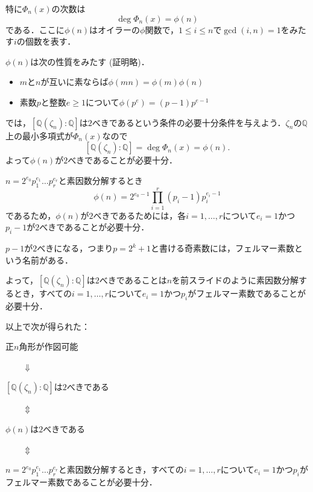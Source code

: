 \documentclass[dvipdfmx,17pt]{beamer}
\theoremstyle{plain}
\newcommand{\Q}{\mathbb{Q}}
\begin{document}
\begin{frame}
特に$\Phi_n(x)$の次数は
\[ \deg \Phi_n(x) = \phi(n) \]
である．ここに$\phi(n)$はオイラーの$\phi$関数で，$1 \le i \le n$で$\gcd(i, n) = 1$をみたす$i$の個数を表す．
\end{frame}

\begin{frame}
$\phi(n)$は次の性質をみたす (証明略)．
\begin{itemize}
\item $m$と$n$が互いに素ならば$\phi(mn) = \phi(m)\phi(n)$
\item 素数$p$と整数$e \ge 1$について$\phi(p^e) = (p-1)p^{e-1}$
\end{itemize}
\end{frame}

\begin{frame}
では，$[\Q(\zeta_n) : \Q]$は$2$べきであるという条件の必要十分条件を与えよう．$\zeta_n$の$\Q$上の最小多項式が$\Phi_n(x)$なので
\[[\Q(\zeta_n) : \Q] = \deg \Phi_n(x) = \phi(n).\]
よって$\phi(n)$が$2$べきであることが必要十分．
\end{frame}

\begin{frame}
$n = 2^{e_0} p_1^{e_1} \dots p_r^{e_r}$と素因数分解するとき
\[\phi(n) = 2^{e_0 - 1} \prod_{i=1}^r (p_i - 1)p_i ^ {e_i - 1} \]
であるため，$\phi(n)$が$2$べきであるためには，各$i = 1, \dots, r$について$e_i = 1$かつ$p_i - 1$が$2$べきであることが必要十分．
\end{frame}

\begin{frame}
$p - 1$が$2$べきになる，つまり$p = 2^k + 1$と書ける奇素数には，フェルマー素数という名前がある．

よって，$[\Q(\zeta_n) : \Q]$は$2$べきであることは$n$を前スライドのように素因数分解するとき，すべての$i = 1, \dots, r$について$e_i = 1$かつ$p_i$がフェルマー素数であることが必要十分．
\end{frame}

\begin{frame}
以上で次が得られた：

正$n$角形が作図可能
\par　　$\Downarrow$\par
$[\Q(\zeta_n) : \Q]$は$2$べきである
\par　　$\Updownarrow$\par
$\phi(n)$は$2$べきである
\par　　$\Updownarrow$\par
$n = 2^{e_0} p_1^{e_1} \dots p_r^{e_r}$と素因数分解するとき，すべての$i = 1, \dots, r$について$e_i = 1$かつ$p_i$がフェルマー素数であることが必要十分．	
\end{frame}
\end{document}
